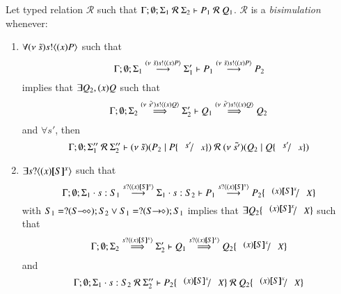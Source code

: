 \begin{definition}[Bisimulation]\rm
	Let typed relation $\mathcal{R}$ such that $\Gamma; \emptyset; \Sigma_1\ \mathcal{R}\ \Sigma_2 \proves P_1\ \mathcal{R}\ Q_1$.
	$\mathcal{R}$ is a {\em bisimulation} whenever:
	\begin{enumerate}
		\item	$\forall (\nu\ \tilde{s}) s ! \langle (x)P \rangle$ such that
			\[
				\Gamma; \emptyset; \Sigma_1 \stackrel{(\nu\ \tilde{s}) s ! \langle (x)P \rangle}{\longrightarrow} \Sigma_1' \vdash P_1 \stackrel{(\nu\ \tilde{s}) s ! \langle (x)P \rangle}{\longrightarrow} P_2
			\]
			implies that $\exists Q_2, (x)Q$ such that
			\[
				\Gamma; \emptyset; \Sigma_2 \stackrel{(\nu\ \tilde{s'}) s ! \langle (x)Q \rangle}{\Longrightarrow} \Sigma_2' \vdash Q_1 \stackrel{(\nu\ \tilde{s'}) s ! \langle (x)Q \rangle}{\Longrightarrow} Q_2
			\]
			and $\forall s'$, %
			then
			\[
				\Gamma; \emptyset; \Sigma_1''\ \mathcal{R}\ \Sigma_2'' \proves \newsp{\tilde{s}}{P_2 \Par P \subst{s'}{x}}\ \mathcal{R}\ 
				\newsp{\tilde{s'}}{Q_2 \Par Q \subst{s'}{x}}
			\]

		\item	$\exists s ? \langle (x)[\!\![S]\!\!]^x \rangle$ such that
			\[
				\Gamma; \emptyset; \Sigma_1 \cat s: S_1 \by{\bactinp{s}{\abs{x} \map{S}^x}} \Sigma_1 \cat s: S_2 \proves P_1 \by{\bactinp{s}{\abs{x} \map{S}^x}} P_2 \subst{\abs{x}{\map{S}^x}}{X}
			\]
			with $S_1 = \btinp{\lhot{S}} S_2 \vee S_1 = \btinp{\shot{S}} S_1$ implies that $\exists Q_2\subst{\abs{x}{\map{S}^x}}{X}$ such that
			\[
				\Gamma; \emptyset; \Sigma_2 \By{\bactinp{s}{\abs{x} \map{S}^x}} \Sigma_2' \proves Q_1 \By{\bactinp{s}{\abs{x} \map{S}^x}} Q_2\subst{\abs{x}{\map{S}^x}}{X}
			\]
			and
			\[
				\Gamma; \emptyset; \Sigma_1 \cat s: S_2\ \mathcal{R}\ \Sigma_2'' \proves P_2  \subst{\abs{x}{\map{S}^x}}{X}\ \mathcal{R}\ 
				Q_2 \subst{\abs{x}{\map{S}^x}}{X}
			\]



\end{enumerate}
\end{definition}
